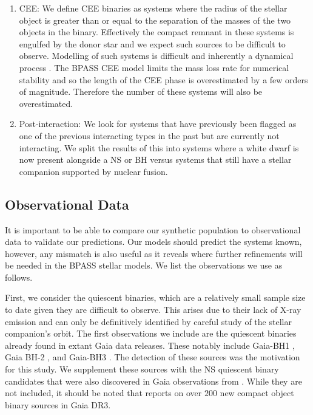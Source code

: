 \documentclass{pas}
\begin{document}
\begin{enumerate}
    \item CEE: We define CEE binaries as systems where the radius of the stellar object is greater than or equal to the separation of the masses of the two objects in the binary. Effectively the compact remnant in these systems is engulfed by the donor star and we expect such sources to be difficult to observe. Modelling of such systems is difficult and inherently a dynamical process \citep[e.g. see recent hydrodynamical models by][]{2025A&A...697A..68G}. The \textsc{BPASS} CEE model limits the mass loss rate for numerical stability and so the length of the CEE phase is overestimated by a few orders of magnitude. Therefore the number of these systems will also be overestimated.
    
    \item Post-interaction: We look for systems that have previously been flagged as one of the previous interacting types in the past but are currently not interacting. We split the results of this into systems where a white dwarf is now present alongside a NS or BH versus systems that still have a stellar companion supported by nuclear fusion.

\end{enumerate}

\subsection{Observational Data}\label{obs}

It is important to be able to compare our synthetic population to observational data to validate our predictions. Our models should predict the systems known, however, any mismatch is also useful as it reveals where further refinements will be needed in the \textsc{BPASS} stellar models. We list the observations we use as follows. 

First, we consider the quiescent binaries, which are a relatively small sample size to date given they are difficult to observe. This arises due to their lack of X-ray emission and can only be definitively identified by careful study of the stellar companion's orbit. The first observations we include are the quiescent binaries already found in extant Gaia data releases. These notably include Gaia-BH1 \citep{El_Badry2023-1}, Gaia BH-2 \citep{El_Badry2023}, and Gaia-BH3 \citep{BH3_2024}. The detection of these sources was the motivation for this study. We supplement these sources with the NS quiescent binary candidates that were also discovered in Gaia observations from \citet{elbadry2024populationneutronstarcandidates}. While they are not included, it should be noted that \citet{2026arXiv260806453E} reports on over $200$ new compact object binary sources in Gaia DR3. 
\end{document}
